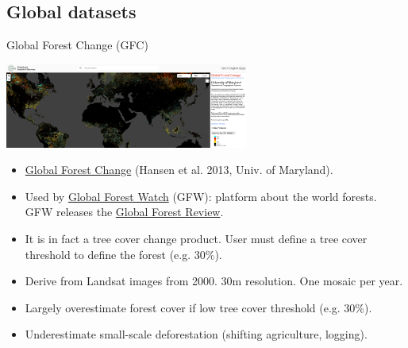 \documentclass[10pt,table,dvipsnames,compress]{beamer}
\begin{document}
\subsection{Global datasets}
\label{sec:org05433a7}

\begin{frame}[label={sec:orgf65d91f}]{Global Forest Change (GFC)}
\begin{center}
\includegraphics[width=8cm]{figs/fcc/gfc.png}
\end{center}

\begin{itemize}
\item \href{https://glad.earthengine.app/view/global-forest-change}{Global Forest Change} (Hansen et al. 2013, Univ. of Maryland).
\item Used by \href{https://www.globalforestwatch.org/}{Global Forest Watch} (GFW): platform about the world forests. GFW releases the \href{https://research.wri.org/gfr/global-forest-review}{Global Forest Review}.
\item It is in fact a tree cover change product. User must define a tree cover threshold to define the forest (e.g. 30\%).
\item Derive from Landsat images from 2000. 30m resolution. One mosaic per year.
\item Largely overestimate forest cover if low tree cover threshold (e.g. 30\%).
\item Underestimate small-scale deforestation (shifting agriculture, logging).
\end{itemize}
\end{frame}
\end{document}
